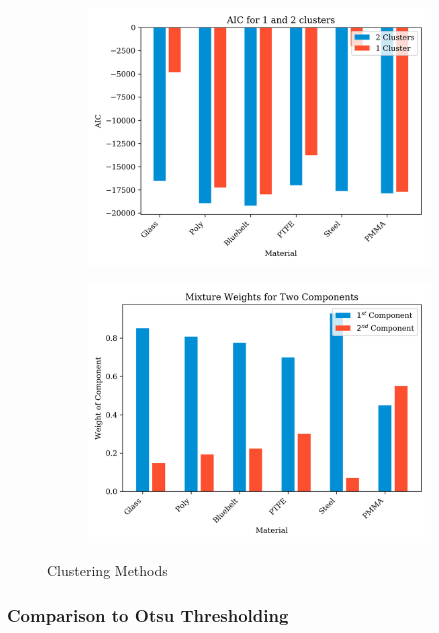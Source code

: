 \documentclass[a4paper,11pt]{article}
\begin{document}
\begin{figure}[b!]
    \centering
    \begin{subfigure}[b]{0.48\textwidth}
        \includegraphics[width=\textwidth]{figures/AIC for 1 and 2 clusters.png}
    \end{subfigure}
    \begin{subfigure}[b]{0.48\textwidth}
        \includegraphics[width=\textwidth]{figures/weights.png}
    \end{subfigure}
    \caption{Clustering Methods}
    \label{n_bins}
\end{figure}

\subsubsection{Comparison to Otsu Thresholding}
\end{document}
